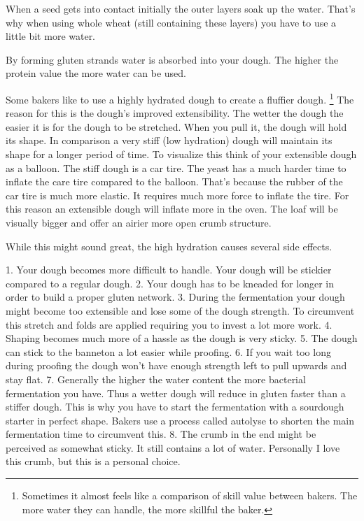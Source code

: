 When a seed gets into contact initially the outer layers soak up the water.
That's why when using whole wheat (still containing these layers) you have to
use a little bit more water.

By forming gluten strands water is absorbed into your dough. The higher the
protein value the more water can be used.

Some bakers like to use a highly hydrated dough to create a fluffier dough.
\footnote{Sometimes it almost feels like a comparison of skill value between bakers. The
more water they can handle, the more skillful the baker.} The reason for this
is the dough's improved extensibility. The wetter the dough the easier it is
for the dough to be stretched. When you pull it, the dough will hold its
shape. In comparison a very stiff (low hydration) dough will maintain its
shape for a longer period of time. To visualize this think of your extensible
dough as a balloon. The stiff dough is a car tire. The yeast has a much harder
time to inflate the care tire compared to the balloon. That's because the
rubber of the car tire is much more elastic. It requires much more force to
inflate the tire. For this reason an extensible dough will inflate more in the
oven. The loaf will be visually bigger and offer an airier more open crumb structure.

While this might sound great, the high hydration causes several side effects.

1. Your dough becomes more difficult to handle. Your dough will be stickier
compared to a regular dough.
2. Your dough has to be kneaded for longer in order to build a proper gluten
network.
3. During the fermentation your dough might become too extensible and lose
some of the dough strength. To circumvent this stretch and folds are applied
requiring you to invest a lot more work.
4. Shaping becomes much more of a hassle as the dough is very sticky.
5. The dough can stick to the banneton a lot easier while proofing.
6. If you wait too long during proofing the dough won't have enough strength
left to pull upwards and stay flat.
7. Generally the higher the water content the more bacterial fermentation you
have. Thus a wetter dough will reduce in gluten faster than a stiffer dough.
This is why you have to start the fermentation with a sourdough starter in
perfect shape. Bakers use a process called autolyse to shorten the main
fermentation time to circumvent this.
8. The crumb in the end might be perceived as somewhat sticky. It still
contains a lot of water. Personally I love this crumb, but this is a personal
choice.

